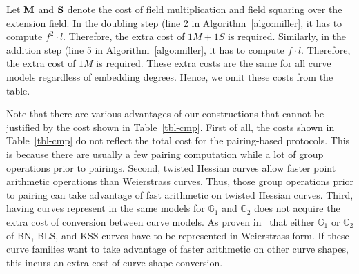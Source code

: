 Let $\textbf{M}$ and $\textbf{S}$ denote the cost of field multiplication and field squaring over the extension field.
In the doubling step (line 2 in Algorithm~\ref{algo:miller},
it has to compute $f^2 \cdot l$.
Therefore, the extra cost of $1M + 1S$ is required.
Similarly, in the addition step (line 5 in Algorithm~\ref{algo:miller},
it has to compute $f \cdot l$.
Therefore, the extra cost of $1M$ is required.
These extra costs are the same for all curve models regardless of embedding degrees.
Hence, we omit these costs from the table.

Note that there are various advantages of our constructions that cannot be justified by the cost shown in Table~\ref{tbl-cmp}.
First of all, the costs shown in Table~\ref{tbl-cmp} do not reflect the total cost for the pairing-based protocols.
This is because there are usually a few pairing computation while a lot of group operations prior to pairings.
Second, twisted Hessian curves allow faster point arithmetic operations than Weierstrass curves.
Thus, those group operations prior to pairing can take advantage of fast arithmetic on twisted Hessian curves.
Third, having curves represent in the same models for $\mathbb{G}_1$ and $\mathbb{G}_2$ does not acquire the extra cost of conversion between curve models.
As proven in~\cite{2013/bos-pairing} that either $\mathbb{G}_1$ or $\mathbb{G}_2$ of BN, BLS, and KSS curves have to be represented in Weierstrass form.
If these curve families want to take advantage of faster arithmetic on other curve shapes, this incurs an extra cost of curve shape conversion.


